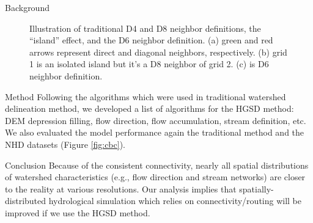 \documentclass[final]{beamer}
\newlength{\onecolwid}
\begin{document}
\begin{frame}[t]
\begin{columns}[t]
\begin{column}{\onecolwid}
\begin{block}{Background}
\begin{figure}[H]
\begin{subfigure}[t]{0.3\textwidth}
            \caption{}
            \label{fig:d6}
          \end{subfigure}
          \caption{Illustration of traditional D4 and D8 neighbor definitions, the ``island'' effect, and the D6 neighbor definition. (a) green and red arrows represent direct and diagonal neighbors, respectively. (b) grid 1 is an isolated island but it's a D8 neighbor of grid 2. (c) is D6 neighbor definition.}
          \label{fig:d4d8_island_d6}
        \end{figure}
      \end{block}
      \begin{block}{Method}
        Following the algorithms which were used in traditional watershed delineation method, we developed a list of algorithms for the HGSD method: DEM depression filling, flow direction, flow accumulation, stream definition, etc.
        We also evaluated the model performance again the traditional method and the NHD datasets (Figure \ref{fig:cbc}).
      \end{block}
      \begin{alertblock}{Conclusion}
        Because of the consistent connectivity, nearly all spatial distributions of watershed characteristics (e.g., flow direction and stream networks) are closer to the reality at various resolutions.
        Our analysis implies that spatially-distributed hydrological simulation which relies on connectivity/routing will be improved if we use the HGSD method.
      \end{alertblock}


\end{column}
\end{columns}
\end{frame}
\end{document}
